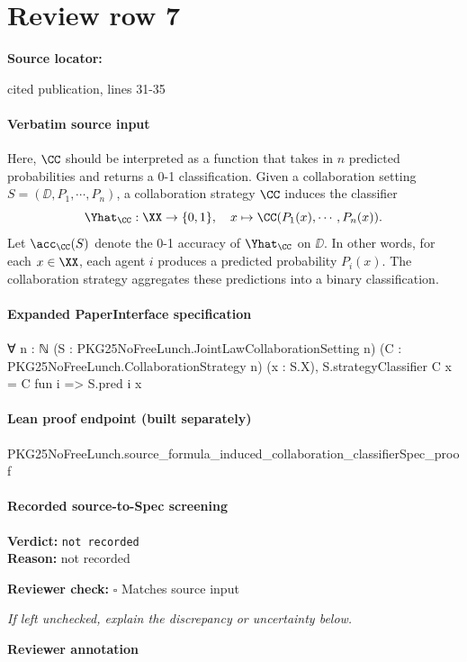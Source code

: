 \documentclass[10pt]{article}
\newcommand{\reviewerbox}{%
  \par\noindent\fbox{\parbox{0.96\linewidth}{\rule{0pt}{0.38in}}}\par
}
\newcommand{\reviewmatch}[1]{%
  \par\noindent\textbf{Reviewer check:} $\square$\; #1\par
  \noindent\emph{If left unchecked, explain the discrepancy or uncertainty below.}\par
}
\begin{document}
\section*{Review row 7}
\textbf{Source locator:} {\footnotesize\raggedright cited publication, lines 31-\allowbreak{}35\par}
\paragraph{Verbatim source input}
\begin{ReviewVerbatim}
Here, $\CC$ should be interpreted as a function that takes in $n$ predicted probabilities and returns a 0-1 classification. Given a collaboration setting $S=(\DD, P_1, \cdots, P_n)$, a collaboration strategy $\CC$ induces the classifier
\begin{equation}
    \Yhat_\CC: \XX \rightarrow \{0,1\},\quad x \mapsto \CC(P_1(x),\cdots,P_n(x)).
\end{equation}
Let $\acc_\CC(S)$ denote the 0-1 accuracy of $\Yhat_\CC$ on $\DD$. In other words, for each $x\in \XX$, each agent $i$ produces a predicted probability $P_i(x).$ The collaboration strategy aggregates these predictions into a binary classification.
\end{ReviewVerbatim}


\paragraph{Expanded PaperInterface specification}
\begin{ReviewVerbatim}
∀ {n : ℕ} (S : PKG25NoFreeLunch.JointLawCollaborationSetting n) (C : PKG25NoFreeLunch.CollaborationStrategy n)
  (x : S.X), S.strategyClassifier C x = C fun i => S.pred i x
\end{ReviewVerbatim}

\paragraph{Lean proof endpoint (built separately)}\begin{ReviewVerbatim}
PKG25NoFreeLunch.source_formula_induced_collaboration_classifierSpec_proof
\end{ReviewVerbatim}

\paragraph{Recorded source-to-Spec screening}
\textbf{Verdict:} \texttt{not recorded}
\\
\textbf{Reason:} not recorded
\reviewmatch{Matches source input}
\noindent\textbf{Reviewer annotation}\par
\reviewerbox
\clearpage
\hypertarget{source-claim-825d56b262a72a57}{}
\end{document}
